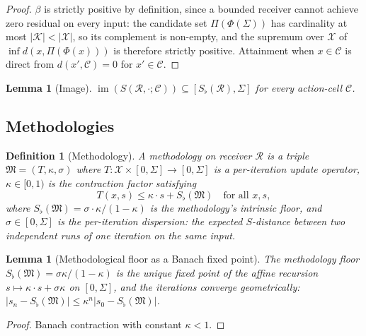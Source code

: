 \documentclass[twocolumn,11pt,a4paper]{article}
\newtheorem{lemma}[theorem]{Lemma}
\newtheorem{definition}[theorem]{Definition}
\DeclareMathOperator{\img}{im}
\newcommand{\Cands}{\mathcal{X}}
\newcommand{\Knowl}{\mathcal{K}}
\newcommand{\Cell}{\mathcal{C}}
\newcommand{\Method}{\mathfrak{M}}
\newcommand{\receiver}{\mathcal{R}}
\newcommand{\Sigmax}{\Sigma}
\newcommand{\Sscalar}{S}
\newcommand{\Sfloor}{S_{\flat}}
\newcommand{\catpow}{\kappa}
\newcommand{\disp}{\sigma}
\begin{document}
\begin{proof}
$\beta$ is strictly positive by definition, since a bounded receiver cannot achieve zero residual on every input: the candidate set $\Pi(\Phi(\Sigma))$ has cardinality at most $|\Knowl| < |\Cands|$, so its complement is non-empty, and the supremum over $\Cands$ of $\inf d(x, \Pi(\Phi(x)))$ is therefore strictly positive. Attainment when $x \in \Cell$ is direct from $d(x', \Cell) = 0$ for $x' \in \Cell$.
\end{proof}

\begin{lemma}[Image]
\label{lem:image}
$\img(\Sscalar(\receiver, \cdot; \Cell)) \subseteq [\Sfloor(\receiver), \Sigmax]$ for every action-cell $\Cell$.
\end{lemma}

\subsection{Methodologies}

\begin{definition}[Methodology]
\label{def:method}
A \emph{methodology} on receiver $\receiver$ is a triple $\Method = (T, \catpow, \disp)$ where $T : \Cands \times [0, \Sigmax] \to [0, \Sigmax]$ is a per-iteration update operator, $\catpow \in [0, 1)$ is the \emph{contraction factor} satisfying
\[
T(x, s) \leq \catpow \cdot s + \Sfloor(\Method) \quad \text{for all } x, s,
\]
where $\Sfloor(\Method) = \disp \cdot \catpow / (1 - \catpow)$ is the methodology's intrinsic floor, and $\disp \in [0, \Sigmax]$ is the per-iteration dispersion: the expected $S$-distance between two independent runs of one iteration on the same input.
\end{definition}

\begin{lemma}[Methodological floor as a Banach fixed point]
\label{lem:methodfloor}
The methodology floor $\Sfloor(\Method) = \disp \catpow / (1 - \catpow)$ is the unique fixed point of the affine recursion $s \mapsto \catpow \cdot s + \disp \catpow$ on $[0, \Sigmax]$, and the iterations converge geometrically: $\lvert s_n - \Sfloor(\Method) \rvert \leq \catpow^n \lvert s_0 - \Sfloor(\Method) \rvert$.
\end{lemma}

\begin{proof}
Banach contraction with constant $\catpow < 1$.
\end{proof}


\end{document}
